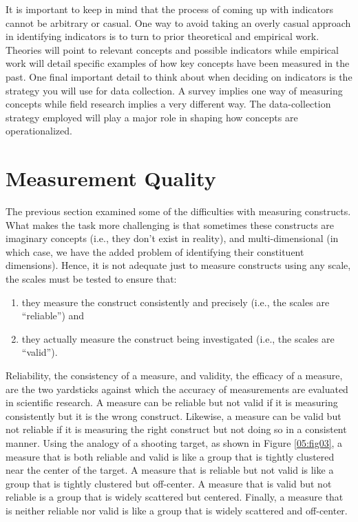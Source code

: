 It is important to keep in mind that the process of coming up with indicators cannot be arbitrary or casual. One way to avoid taking an overly casual approach in identifying indicators is to turn to prior theoretical and empirical work. Theories will point to relevant concepts and possible indicators while empirical work will detail specific examples of how key concepts have been measured in the past. One final important detail to think about when deciding on indicators is the strategy you will use for data collection. A survey implies one way of measuring concepts while field research implies a very different way. The data-collection strategy employed will play a major role in shaping how concepts are operationalized.

\section{Measurement Quality}

The previous section examined some of the difficulties with measuring constructs. What makes the task more challenging is that sometimes these constructs are imaginary concepts (i.e., they don’t exist in reality), and multi-dimensional (in which case, we have the added problem of identifying their constituent dimensions). Hence, it is not adequate just to measure constructs using any scale, the scales must be tested to ensure that: 

\begin{enumerate}
	\item they measure the construct consistently and precisely (i.e., the scales are ``reliable'') and 

	\item they actually measure the construct being investigated (i.e., the scales are ``valid''). 
\end{enumerate}

Reliability, the consistency of a measure, and validity, the efficacy of a measure, are the two yardsticks against which the accuracy of measurements are evaluated in scientific research. A measure can be reliable but not valid if it is measuring consistently but it is the wrong construct. Likewise, a measure can be valid but not reliable if it is measuring the right construct but not doing so in a consistent manner. Using the analogy of a shooting target, as shown in Figure \ref{05:fig03}, a measure that is both reliable and valid is like a group that is tightly clustered near the center of the target. A measure that is reliable but not valid is like a group that is tightly clustered but off-center. A measure that is valid but not reliable is a group that is widely scattered but centered. Finally, a measure that is neither reliable nor valid is like a group that is widely scattered and off-center. 

